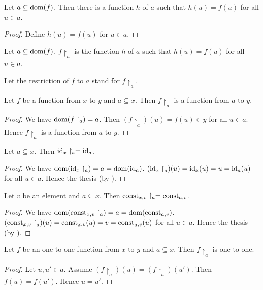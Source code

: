 \documentclass[../../set-theory.tex]{subfiles}
\begin{document}
  \begin{forthel}
    \begin{lemma}
      Let $a \subseteq \operatorname{dom}(f)$.
      Then there is a function $h$ of $a$ such that $h(u) = f(u)$ for all $u \in a$.
    \end{lemma}
    \begin{proof}
      Define $h(u) = f(u)$ for $u \in a$.
    \end{proof}

    \begin{definition}
      Let $a \subseteq \operatorname{dom}(f)$.
      $f \restriction_{a}$ is the function $h$ of $a$ such that $h(u) = f(u)$ for all $u \in a$.
    \end{definition}

    Let the restriction of $f$ to $a$ stand for $f \restriction_{a}$.

    \begin{proposition}\label{SetTheory_02_01_589280}
      Let $f$ be a function from $x$ to $y$ and $a \subseteq x$.
      Then $f \restriction_{a}$ is a function from $a$ to $y$.
    \end{proposition}
    \begin{proof}
      We have $\operatorname{dom}(f \restriction_{a}) = a$.
      Then $(f \restriction_{a})(u) = f(u) \in y$ for all $u \in a$.
      Hence $f \restriction_{a}$ is a function from $a$ to $y$.
    \end{proof}

    \begin{proposition}\label{SetTheory_02_01_795968}
      Let $a \subseteq x$.
      Then $\operatorname{id}_{x} \restriction_{a} = \operatorname{id}_{a}$.
    \end{proposition}
    \begin{proof}
      We have $\operatorname{dom}(\operatorname{id}_{x} \restriction_{a}) = a = \operatorname{dom}(\operatorname{id}_{a})$.
      $(\operatorname{id}_{x} \restriction_{a})(u) = \operatorname{id}_{x}(u) = u = \operatorname{id}_{a}(u)$ for all $u \in a$.
      Hence the thesis (by ).
    \end{proof}

    \begin{proposition}\label{SetTheory_02_01_575265}
      Let $v$ be an element and $a \subseteq x$.
      Then $\mbox{const}_{x,v} \restriction_{a} = \mbox{const}_{a,v}$.
    \end{proposition}
    \begin{proof}
      We have $\operatorname{dom}(\mbox{const}_{x,v} \restriction_{a}) = a = \operatorname{dom}(\mbox{const}_{a,v})$.
      $(\mbox{const}_{x,v} \restriction_{a})(u) = \mbox{const}_{x,v}(u) = v = \mbox{const}_{a,v}(u)$ for all $u \in a$.
      Hence the thesis (by ).
    \end{proof}

    \begin{proposition}\label{SetTheory_02_01_507691}
      Let $f$ be an one to one function from $x$ to $y$ and $a \subseteq x$.
      Then $f \restriction_{a}$ is one to one.
    \end{proposition}
    \begin{proof}
      Let $u,u' \in a$.
      Assume $(f \restriction_{a})(u) = (f \restriction_{a})(u')$.
      Then $f(u) = f(u')$.
      Hence $u = u'$.
    \end{proof}
  \end{forthel}
\end{document}
